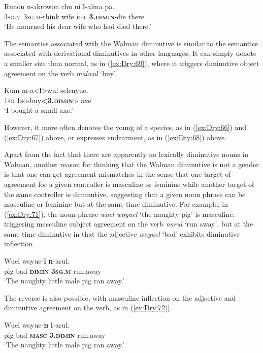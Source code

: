\documentclass[output=collectionpaper]{langsci/langscibook}
\begin{document}
\ea \label{ex:Dry:68}
\gll Runon	n-akrowon	chu	ni	\textbf{l}-alma	pa.\\
\textsc{3sg.m} \textsc{3sg.m}-think wife \textsc{rel} \textbf{\textsc{3.dimin}}-die there\\
\glt `He mourned his dear wife who had died there.'
\z

The semantics associated with the Walman diminutive is similar to the semantics associated with derivational diminutives in other languages. It can simply denote a smaller size than normal, as in (\ref{ex:Dry:69}), where it triggers diminutive object agreement on the verb \textit{malwul} `buy'.

\ea \label{ex:Dry:69}
\gll Kum	m-a<\textbf{l}>wul	selenyue.\\
\textsc{1sg} \textsc{1sg}-buy\textbf{<\textsc{3.dimin}}> axe\\
\glt `I bought a small axe.'
\z

However, it more often denotes the young of a species, as in (\ref{ex:Dry:66}) and (\ref{ex:Dry:67}) above, or expresses endearment, as in (\ref{ex:Dry:68}) above.

Apart from the fact that there are apparently no lexically diminutive nouns in Walman, another reason for thinking that the Walman diminutive is not a gender is that one can get agreement mismatches in the sense that one target of agreement for a given controller is masculine or feminine while another target of the same controller is diminutive, suggesting that a given noun phrase can be masculine or feminine but at the same time diminutive. For example, in (\ref{ex:Dry:71}), the noun phrase \textit{wuel woyuel} `the naughty pig' is masculine, triggering masculine subject agreement on the verb \textit{narul} `run away', but at the same time diminutive in that the adjective \textit{woyuel} `bad' exhibits diminutive inflection.

\ea \label{ex:Dry:71}
\gll Wuel	woyue-\textbf{l}	\textbf{n}-arul.\\
pig bad-\textbf{\textsc{dimin}} \textbf{\textsc{3sg.m}}-run.away\\
\glt `The naughty little male pig ran away.'
\z

The reverse is also possible, with masculine inflection on the adjective and diminutive agreement on the verb, as in (\ref{ex:Dry:72}).

\ea \label{ex:Dry:72}
\gll Wuel	woyue-\textbf{n}	\textbf{l}-arul.\\
pig bad-\textbf{\textsc{masc}} \textbf{\textsc{3.dimin}}-run.away\\
\glt `The naughty little male pig ran away.'
\z
\end{document}
